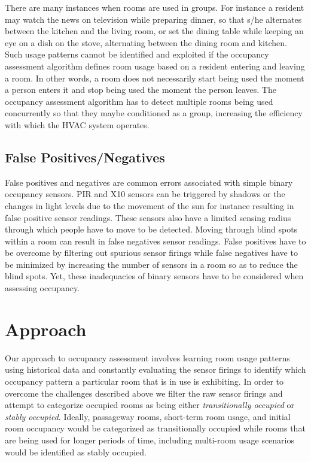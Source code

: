 There are many instances when rooms are used in groups. For instance a resident
may watch the news on television while preparing dinner, so that s/he alternates
between the kitchen and the living room, or set the dining table while keeping
an eye on a dish on the stove, alternating between the dining room and
kitchen. Such usage patterns cannot be identified and exploited if the occupancy
assessment algorithm defines room usage based on a resident entering and leaving
a room. In other words, a room does not necessarily start being used the moment
a person enters it and stop being used the moment the person leaves. The
occupancy assessment algorithm has to detect multiple rooms being used
concurrently so that they maybe conditioned as a group, increasing the
efficiency with which the HVAC system operates.

\subsection{False Positives/Negatives}
\label{sec:falsePositives}

False positives and negatives are common errors associated with simple binary
occupancy sensors. PIR and X10 sensors can be triggered by shadows or the
changes in light levels due to the movement of the sun for instance resulting in
false positive sensor readings. These sensors also have a limited sensing radius
through which people have to move to be detected. Moving through blind spots
within a room can result in false negatives sensor readings. False positives
have to be overcome by filtering out spurious sensor firings while false
negatives have to be minimized by increasing the number of sensors in a room so
as to reduce the blind spots. Yet, these inadequacies of binary sensors have to
be considered when assessing occupancy.

\section{Approach}
\label{sec:occupancyAssessmentApproach}

Our approach to occupancy assessment involves learning room usage patterns using
historical data and constantly evaluating the sensor firings to identify which
occupancy pattern a particular room that is in use is exhibiting. In order to
overcome the challenges described above we filter the raw sensor firings and
attempt to categorize occupied rooms as being either {\em transitionally
  occupied} or {\em stably occupied}. Ideally, passageway rooms, short-term room
usage, and initial room occupancy would be categorized as transitionally
occupied while rooms that are being used for longer periods of time, including
multi-room usage scenarios would be identified as stably occupied.   

